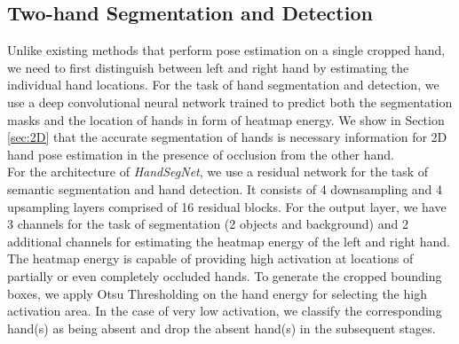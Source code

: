 \documentclass[10pt,twocolumn,letterpaper]{article}
\begin{document}
\subsection{Two-hand Segmentation and Detection}
\indent Unlike existing methods that perform pose estimation on a single cropped hand, we need to first distinguish between left and right hand by estimating the individual hand locations. For the task of hand segmentation and detection, we use a deep convolutional neural network trained to predict both the segmentation masks and the location of hands in form of heatmap energy. We show in Section \ref{sec:2D} that the accurate segmentation of hands is necessary information for 2D hand pose estimation in the presence of occlusion from the other hand.\\
\indent For the architecture of \textit{HandSegNet}, we use a residual network for the task of semantic segmentation and hand detection. It consists of 4 downsampling and 4 upsampling layers comprised of 16 residual blocks. For the output layer, we have 3 channels for the task of segmentation (2 objects and background) and 2 additional channels for estimating the heatmap energy of the left and right hand. The heatmap energy is capable of providing high activation at locations of partially or even completely occluded hands. To generate the cropped bounding boxes, we apply Otsu Thresholding on the hand energy for selecting the high activation area. In the case of very low activation, we classify the corresponding hand(s) as being absent and drop the absent hand(s) in the subsequent stages.
\end{document}
